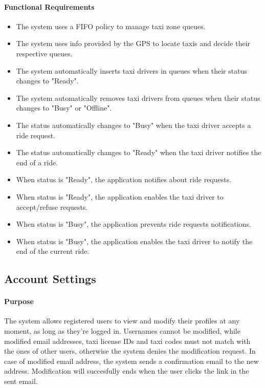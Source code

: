 \paragraph{Functional Requirements}
\begin{itemize}
	
	\item The system uses a FIFO policy to manage taxi zone queues.
	
	\item The system uses info provided by the GPS to locate taxis and decide their respective queues.
	
	\item The system automatically inserts taxi drivers in queues when their status changes to "Ready".
	
	\item The system automatically removes taxi drivers from queues when their status changes to "Busy" or "Offline".
	
	\item The status automatically changes to "Busy" when the taxi driver accepts a ride request.
	
	\item The status automatically changes to "Ready" when the taxi driver notifies the end of a ride.
	
	\item When status is "Ready", the application notifies about ride requests.
	
	\item When status is "Ready", the application enables the taxi driver to accept/refuse requests.
	
	\item When status is "Busy", the application prevents ride requests notifications.
	
	\item When status is "Busy", the application enables the taxi driver to notify the end of the current ride.
	
\end{itemize}

\subsection{Account Settings}

\paragraph{Purpose}
The system allows registered users to view and modify their profiles at any moment, as long as they're logged in. Usernames cannot be modified, while modified email addresses, taxi license IDs and taxi codes must not match with the ones of other users, otherwise the system denies the modification request. In case of modified email address, the system sends a confirmation email to the new address. Modification will succesfully ends when the user clicks the link in the sent email. 

